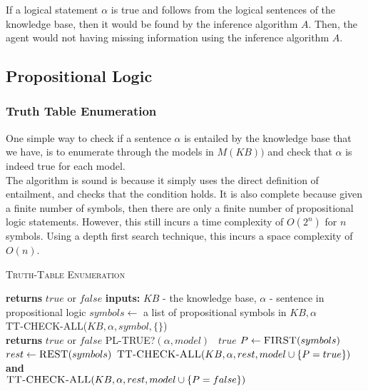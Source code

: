 \documentclass[12pt]{article}
\begin{document}
If a logical statement $\alpha$ is true and follows from the logical sentences of the knowledge base, then it would be found by the inference algorithm $A$. Then, the agent would not having missing information using the inference algorithm $A$.

\subsection{Propositional Logic}

\subsubsection{Truth Table Enumeration}

One simple way to check if a sentence $\alpha$ is entailed by the knowledge base that we have, is to enumerate through the models in $M(KB))$ and check that $\alpha$ is indeed true for each model.\\

The algorithm is sound is because it simply uses the direct definition of entailment, and checks that the condition holds. It is also complete because given a finite number of symbols, then there are only a finite number of propositional logic statements. However, this still incurs a time complexity of $O(2^n)$ for $n$ symbols. Using a depth first search technique, this incurs a space complexity of $O(n)$.

\begin{algorithm}
\caption{\textsc{Truth-Table Enumeration}}\label{euclid}
\begin{algorithmic}[1]
 \textbf{returns} $true$ or $false$
\State \textbf{inputs: } $KB$ - the knowledge base, $\alpha$ - sentence in propositional logic
\State $symbols \leftarrow$ a list of propositional symbols in $KB, \alpha$\\
\Return \textsc{TT-CHECK-ALL($KB, \alpha, symbol, \{\}$)} 
\EndProcedure
\\
 \textbf{returns} $true$ or $false$
\Return \textsc{PL-TRUE?}$(\alpha, model)$
\Else \
\Return $true$
\EndIf
\Else
\State $P \leftarrow \textsc{FIRST}(symbols)$
\State $rest \leftarrow \textsc{REST}(symbols)$
\State \Return $\textsc{TT-CHECK-ALL}(KB, \alpha, rest, model \cup \{ P = true\})$ \textbf{and}\\  $\textsc{TT-CHECK-ALL}(KB, \alpha, rest, model \cup \{ P = false\})$
\EndIf
\EndProcedure
\end{algorithmic}
\end{algorithm}
\end{document}
